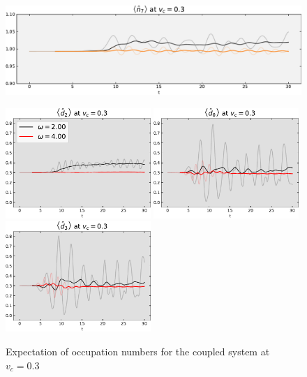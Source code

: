 \begin{figure}[!hbt]
\begin{minipage}[b]{.49\textwidth}
                \includegraphics[trim=0 0 0 -4, clip, width=1.00\textwidth]{graph/occupation/occupation_site_7_vc_03.pdf}
       \caption{Expectation of occupation numbers for the coupled system at $v_c = 0.3$}
        \label{fig:occupation_vc_03}
    \end{minipage}
    \hfill
    \begin{minipage}[b]{.49\textwidth}
                \centering
                \includegraphics[width=0.49\textwidth]{graph/double_occupation/double_occupation_vc_03_site_2.pdf}
                \includegraphics[width=0.49\textwidth]{graph/double_occupation/double_occupation_vc_03_site_0.pdf}
                \includegraphics[width=0.49\textwidth]{graph/double_occupation/double_occupation_vc_03_site_3.pdf}

\end{minipage}
\end{figure}
